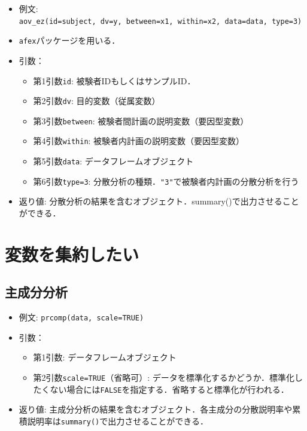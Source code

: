 \documentclass[
  xelatex, ja=standard]{bxjsarticle}
\providecommand{\tightlist}{%
  \setlength{\itemsep}{0pt}\setlength{\parskip}{0pt}}
\begin{document}
\begin{itemize}
\tightlist
\item
  例文:
  \texttt{aov\_ez(id=subject,\ dv=y,\ between=x1,\ within=x2,\ data=data,\ type=3)}
\item
  \texttt{afex}パッケージを用いる．
\item
  引数：

  \begin{itemize}
  \tightlist
  \item
    第1引数\texttt{id}: 被験者IDもしくはサンプルID．
  \item
    第2引数\texttt{dv}: 目的変数（従属変数）
  \item
    第3引数\texttt{between}: 被験者間計画の説明変数（要因型変数）
  \item
    第4引数\texttt{within}: 被験者内計画の説明変数（要因型変数）
  \item
    第5引数\texttt{data}: データフレームオブジェクト
  \item
    第6引数\texttt{type=3}:
    分散分析の種類．\texttt{"3"}で被験者内計画の分散分析を行う
  \end{itemize}
\item
  返り値:
  分散分析の結果を含むオブジェクト．summary()で出力させることができる．
\end{itemize}

\section{変数を集約したい}\label{ux5909ux6570ux3092ux96c6ux7d04ux3057ux305fux3044}

\subsection{主成分分析}\label{ux4e3bux6210ux5206ux5206ux6790}

\begin{itemize}
\tightlist
\item
  例文: \texttt{prcomp(data,\ scale=TRUE)}
\item
  引数：

  \begin{itemize}
  \tightlist
  \item
    第1引数: データフレームオブジェクト
  \item
    第2引数\texttt{scale=TRUE}（省略可）:
    データを標準化するかどうか．標準化したくない場合には\texttt{FALSE}を指定する．省略すると標準化が行われる．
  \end{itemize}
\item
  返り値:
  主成分分析の結果を含むオブジェクト．各主成分の分散説明率や累積説明率は\texttt{summary()}で出力させることができる．
\end{itemize}
\end{document}
